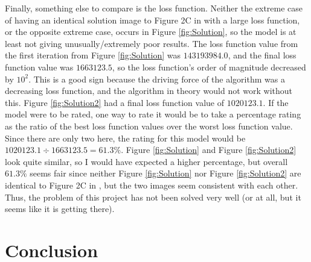 \documentclass[12pt]{article}
\begin{document}
Finally, something else to compare is the loss function. Neither the extreme case of having an identical solution image to Figure 2C in \cite{Neural} with a large loss function, or the opposite extreme case, occurs in Figure \ref{fig:Solution}, so the model is at least not giving unusually/extremely poor results. The loss function value from the first iteration from Figure \ref{fig:Solution} was $143193984.0$, and the final loss function value was $1663123.5$, so the loss function's order of magnitude decreased by $10^2$. This is a good sign because the driving force of the algorithm was a decreasing loss function, and the algorithm in theory would not work without this. Figure \ref{fig:Solution2} had a final loss function value of $1020123.1$. If the model were to be rated, one way to rate it would be to take a percentage rating as the ratio of the best loss function values over the worst loss function value. Since there are only two here, the rating for this model would be $1020123.1 \div 1663123.5 = 61.3\%$. Figure \ref{fig:Solution} and Figure \ref{fig:Solution2} look quite similar, so I would have expected a higher percentage, but overall $61.3\%$ seems fair since neither Figure \ref{fig:Solution} nor Figure \ref{fig:Solution2} are identical to Figure 2C in \cite{Neural}, but the two images seem consistent with each other. Thus, the problem of this project has not been solved very well (or at all, but it seems like it is getting there).

\section{Conclusion}
\end{document}
